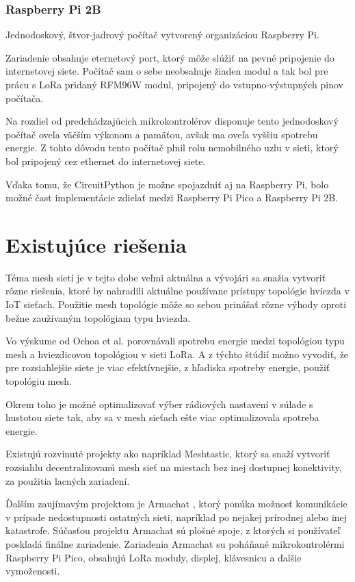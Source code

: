 \documentclass[slovak,master]{diploma}
\begin{document}
\subsection{Raspberry Pi 2B}
Jednodoskový, štvor-jadrový počítač vytvorený organizáciou Raspberry Pi.

Zariadenie obsahuje eternetový port, ktorý môže slúžiť na pevné pripojenie do internetovej siete.
Počítač sam o sebe neobsahuje žiaden modul a tak bol pre prácu s LoRa pridaný RFM96W modul, pripojený do vstupno-výstupných pinov počítača.

Na rozdiel od predchádzajúcich mikrokontrolérov disponuje tento jednodoskový počítač oveľa väčším výkonom a pamäťou, 
avšak ma oveľa vyššiu spotrebu energie. Z tohto dôvodu tento počítač plnil rolu nemobilného uzlu v sieti, ktorý bol pripojený cez ethernet do internetovej siete.

Vďaka tomu, že CircuitPython je možne spojazdniť aj na Raspberry Pi, bolo možné čast implementácie zdielať medzi Raspberry Pi Pico a Raspberry Pi 2B.


\chapter{Existujúce riešenia}
Téma mesh sietí je v tejto dobe veľmi aktuálna a vývojári sa snažia vytvoriť rôzne riešenia, ktoré by nahradili aktuálne používane 
prístupy topológie hviezda v IoT sieťach. Použitie mesh topológie môže so sebou prinášať rôzne výhody oproti bežne zaužívaným topológiam typu hviezda.

Vo výskume od Ochoa et al. \cite{8115793} porovnávali spotrebu energie medzi 
topológiou typu mesh a hviezdicovou topológiou v sieti LoRa. A z týchto štúdií možno vyvodiť, že pre rozsiahlejšie siete je viac
efektívnejšie, z hľadiska spotreby energie, použiť topológiu mesh. 

Okrem toho je možné optimalizovať výber rádiových nastavení v súlade s hustotou siete tak, 
aby sa v mesh sieťach ešte viac optimalizovala spotreba energie.

Existujú rozvinuté projekty ako napríklad Meshtastic, ktorý sa snaží vytvoriť rozsiahlu decentralizovanú mesh sieť na miestach bez inej dostupnej konektivity, 
za použitia lacných zariadení.

Ďalším zaujímavým projektom je Armachat \cite{armachat}, ktorý ponúka možnosť komunikácie v prípade nedostupnosti ostatných sieti, napríklad po nejakej prírodnej alebo inej katastrofe.
Súčasťou projektu Armachat sú plošné spoje, z ktorých si používateľ poskladá finálne zariadenie.
Zariadenia Armachat su poháňané mikrokontrolérmi Raspberry Pi Pico, obsahujú LoRa moduly, displej, klávesnicu a ďalšie vymoženosti.
\end{document}
